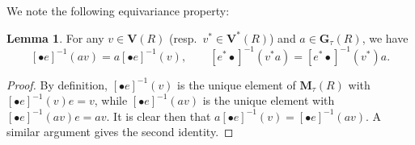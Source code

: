 \documentclass[reqno]{amsart}
\theoremstyle{plain} \newtheorem{theorem} {Theorem} \newtheorem{conjecture} {Conjecture} \newtheorem{corollary} [theorem] {Corollary} \newtheorem{proposition} [theorem] {Proposition} \newtheorem{fact} [theorem] {Fact}
\theoremstyle{definition} \newtheorem{definition} [theorem] {Definition}
\theoremstyle{itplain} %
\newtheorem{lemma}[theorem]{Lemma}
\begin{document}
We note the following equivariance property:
\begin{lemma}\label{lemma:equivariance-property-of-bullet-e-e-star-inverse-maps}
  For any $v \in \mathbf{V}(R)$ (resp.\ $v^* \in \mathbf{V}^*(R)$) and $a \in \mathbf{G}_{\tau}(R)$, we have
  \begin{equation*} {[\bullet e]}^{-1}(a v) = a {[\bullet e]}^{-1}(v), \qquad {[e^* \bullet ]}^{-1}(v^* a) = {[e^* \bullet]}^{-1}(v^*) a.
  \end{equation*}
\end{lemma}
\begin{proof}
  By definition, ${[\bullet e]}^{-1}(v)$ is the unique element of $\mathbf{M}_\tau(R)$ with ${[\bullet e]}^{-1}(v) e = v$, while ${[\bullet e]}^{-1}(a v)$ is the unique element with ${[\bullet e]}^{-1}(a v) e = a v$.  It is clear then that $a {[\bullet e]}^{-1}(v) = {[\bullet e]}^{-1}(a v)$.  A similar argument gives the second identity.
\end{proof}
\end{document}
